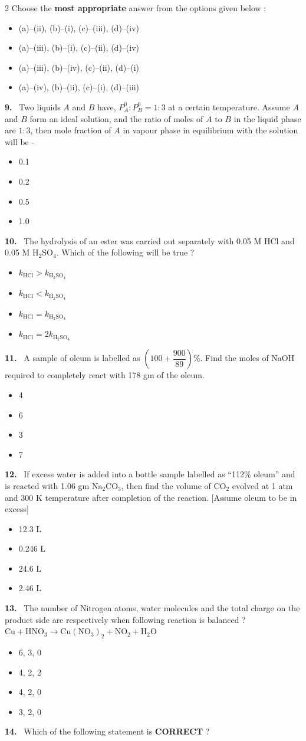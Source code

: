 \documentclass[10pt]{extarticle}
\newcommand{\qn}[1]{\par\smallskip\noindent\textbf{#1.}~}
\newenvironment{qoptions}{\begin{itemize}[leftmargin=1.8em,itemsep=1pt,topsep=2pt,label={}]}{\end{itemize}}
\newcommand{\opt}[2]{\item[(#1)] #2}
\begin{document}
\begin{multicols}{2}
Choose the \textbf{most appropriate} answer from the options given below :
\begin{qoptions}
\opt{A}{(a)--(ii), (b)--(i), (c)--(iii), (d)--(iv)}
\opt{B}{(a)--(iii), (b)--(i), (c)--(ii), (d)--(iv)}
\opt{C}{(a)--(iii), (b)--(iv), (c)--(ii), (d)--(i)}
\opt{D}{(a)--(iv), (b)--(ii), (c)--(i), (d)--(iii)}
\end{qoptions}
\qn{9} Two liquids $A$ and $B$ have, $P_A^0:P_B^0=1:3$ at a certain temperature. Assume $A$ and $B$ form an ideal solution, and the ratio of moles of $A$ to $B$ in the liquid phase are $1:3$, then mole fraction of $A$ in vapour phase in equilibrium with the solution will be -
\begin{qoptions}
\opt{A}{0.1}
\opt{B}{0.2}
\opt{C}{0.5}
\opt{D}{1.0}
\end{qoptions}
\qn{10} The hydrolysis of an ester was carried out separately with 0.05 M HCl and 0.05 M $\mathrm{H_2SO_4}$. Which of the following will be true ?\\
\relax[$k$ = first order rate constant of reaction]
\begin{qoptions}
\opt{A}{$k_{\mathrm{HCl}}>k_{\mathrm{H_2SO_4}}$}
\opt{B}{$k_{\mathrm{HCl}}<k_{\mathrm{H_2SO_4}}$}
\opt{C}{$k_{\mathrm{HCl}}=k_{\mathrm{H_2SO_4}}$}
\opt{D}{$k_{\mathrm{HCl}}=2k_{\mathrm{H_2SO_4}}$}
\end{qoptions}
\qn{11} A sample of oleum is labelled as $\left(100+\dfrac{900}{89}\right)\%$. Find the moles of NaOH required to completely react with 178 gm of the oleum.
\begin{qoptions}
\opt{A}{4}
\opt{B}{6}
\opt{C}{3}
\opt{D}{7}
\end{qoptions}
\qn{12} If excess water is added into a bottle sample labelled as ``112\% oleum'' and is reacted with 1.06 gm $\mathrm{Na_2CO_3}$, then find the volume of $\mathrm{CO_2}$ evolved at 1 atm and 300 K temperature after completion of the reaction. [Assume oleum to be in excess]
\begin{qoptions}
\opt{A}{12.3 L}
\opt{B}{0.246 L}
\opt{C}{24.6 L}
\opt{D}{2.46 L}
\end{qoptions}
\qn{13} The number of Nitrogen atoms, water molecules and the total charge on the product side are respectively when following reaction is balanced ?\\
$\mathrm{Cu+HNO_3\to Cu(NO_3)_2+NO_2+H_2O}$
\begin{qoptions}
\opt{A}{6, 3, 0}
\opt{B}{4, 2, 2}
\opt{C}{4, 2, 0}
\opt{D}{3, 2, 0}
\end{qoptions}
\qn{14} Which of the following statement is \textbf{CORRECT} ?

\end{multicols}
\end{document}
